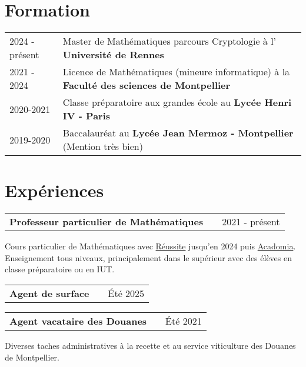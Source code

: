 \documentclass[a4paper,12pt]{article}
\makeatletter
\newenvironment{jobshort}[2]
    {
    \begin{tabularx}{\linewidth}{@{}l X r@{}}
    \textbf{#1} & \hfill &  #2 \\[3.75pt]
    \end{tabularx}
    }
    {
    }
\newenvironment{joblong}[2]
    {
    \begin{tabularx}{\linewidth}{@{}l X r@{}}
    \textbf{#1} & \hfill &  #2 \\[3.75pt]
    \end{tabularx}
    \begin{minipage}[t]{\linewidth}
    \begin{itemize}[nosep,after=\strut, leftmargin=1em, itemsep=3pt,label=--]
    }
    {
    \end{itemize}
    \end{minipage}    
    }
\makeatother
\begin{document}
\section{Formation}
\begin{tabularx}{\linewidth}{@{}l X@{}}	


2024 - présent & Master de Mathématiques parcours Cryptologie à l' \textbf{Université de Rennes} \hfill  \\ 

2021 - 2024 & Licence de Mathématiques (mineure informatique) à la \textbf{Faculté des sciences de Montpellier} \hfill   \\

2020-2021 & Classe préparatoire aux grandes école au \textbf{Lycée Henri IV - Paris} \hfill   \\

2019-2020 & Baccalauréat au \textbf{Lycée Jean Mermoz - Montpellier} \hfill (Mention très bien)
\end{tabularx}


\section{Expériences}

\begin{jobshort}{Professeur particulier de Mathématiques}{2021 - présent}
Cours particulier de Mathématiques avec \href{https://groupe-reussite.fr/}{Réussite} jusqu'en 2024 puis \href{https://www.acadomia.fr/}{Acadomia}. Enseignement tous niveaux, principalement dans le supérieur avec des élèves en classe préparatoire ou en IUT.
\end{jobshort}

\begin{jobshort}{Agent de surface}{Été 2025}
\end{jobshort}

\begin{jobshort}{Agent vacataire des Douanes}{Été 2021}
Diverses taches administratives à la recette et au service viticulture des Douanes de Montpellier.
\end{jobshort}   

\end{document}
